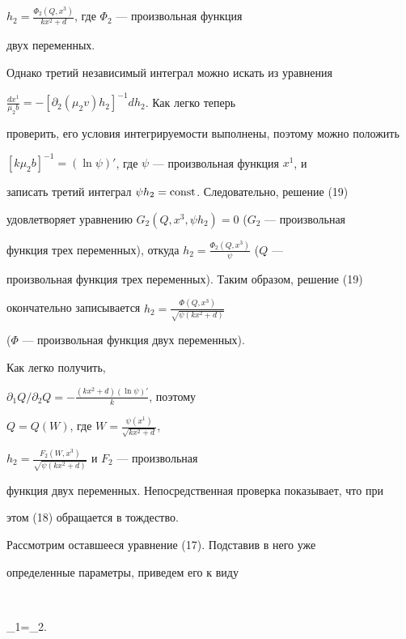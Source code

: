 $h_2=\frac{\Phi_2(Q,x^3)}{kx^2+d}$, где $\Phi_2$ --- произвольная функция 


двух переменных. 


 


Однако третий независимый интеграл можно искать из уравнения 


$\frac{dx^1}{\mu_2b}=-[\partial_2(\mu_2v)h_2]^{-1}dh_2$. Как легко теперь 


проверить, его условия интегрируемости выполнены, поэтому можно положить 


$[k\mu_2b]^{-1}=(\ln\psi)'$, где $\psi$ --- произвольная функция $x^1$, и 


записать третий интеграл $\psi h_2=\operatorname{const}$. Следовательно, решение (19) 


удовлетворяет уравнению $G_2(Q,x^3,\psi h_2)=0$ ($G_2$ --- произвольная 


функция трех переменных), откуда $h_2=\frac{\Phi_2(Q,x^3)}{\psi}$ ($Q$ --- 


произвольная функция трех переменных). Таким образом, решение (19) 


окончательно записывается $h_2=\frac{\Phi(Q,x^3)}{\sqrt{\psi(kx^2+d)}}$ 


($\Phi$ --- произвольная функция двух переменных). 


 


Как легко получить, 


$\partial_1Q/\partial_2Q=-\frac{(kx^2+d)(\ln\psi)'}{k}$, поэтому 


$Q=Q(W)$, где $W=\frac{\psi(x^1)}{\sqrt{kx^2+d}}$, 


$h_2=\frac{F_2(W,x^3)}{\sqrt{\psi(kx^2+d)}}$ и $F_2$ --- произвольная 


функция двух переменных. Непосредственная проверка показывает, что при 


этом (18) обращается в тождество. 


 


Рассмотрим оставшееся уравнение (17). Подставив в него уже 


определенные параметры, приведем его к виду 


$$ 


\partial_1=\partial_2. 


